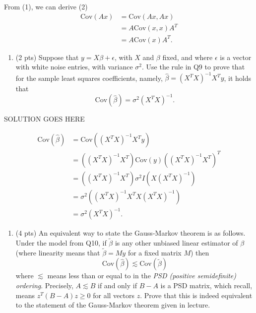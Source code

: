 \documentclass[
]{article}
\providecommand{\tightlist}{%
  \setlength{\itemsep}{0pt}\setlength{\parskip}{0pt}}
\begin{document}
From (1), we can derive (2) \begin{align*}
    \mathrm{Cov}(Ax) & = \mathrm{Cov}(Ax,Ax) \\
    & = A\mathrm{Cov}(x, x)A^T \\
    & = A\mathrm{Cov}(x)A^T.
\end{align*}

\begin{enumerate}
\def\labelenumi{\arabic{enumi}.}
\setcounter{enumi}{9}
\tightlist
\item
  (2 pts) Suppose that \(y = X \beta + \epsilon\), with \(X\) and
  \(\beta\) fixed, and where \(\epsilon\) is a vector with white noise
  entries, with variance \(\sigma^2\). Use the rule in Q9 to prove that
  for the sample least squares coefficients, namely,
  \(\hat\beta = (X^T X)^{-1} X^T y\), it holds that \[
  \mathrm{Cov}(\hat\beta) = \sigma^2 (X^T X)^{-1}.
  \]
\end{enumerate}

SOLUTION GOES HERE

\begin{align*}
    \mathrm{Cov}(\hat{\beta}) & = \mathrm{Cov}\left(\left(X^TX\right)^{-1}X^Ty\right) \\
    & = \left(\left(X^TX\right)^{-1}X^T\right)\mathrm{Cov}(y)\left(\left(X^TX\right)^{-1}X^T\right)^T \\
    & = \left(\left(X^TX\right)^{-1}X^T\right)\sigma^2I\left(X\left(X^TX\right)^{-1}\right) \\
    & = \sigma^2\left(\left(X^TX\right)^{-1}X^TX\left(X^TX\right)^{-1}\right) \\
    & = \sigma^2\left(X^TX\right)^{-1}.
\end{align*}

\begin{enumerate}
\def\labelenumi{\arabic{enumi}.}
\setcounter{enumi}{10}
\tightlist
\item
  (4 pts) An equivalent way to state the Gauss-Markov theorem is as
  follows. Under the model from Q10, if \(\tilde\beta\) is any other
  unbiased linear estimator of \(\beta\) (where linearity means that
  \(\tilde\beta = My\) for a fixed matrix \(M\)) then \[
  \mathrm{Cov}(\hat\beta) \lesssim \mathrm{Cov}(\tilde\beta)
  \] where \(\lesssim\) means less than or equal to in the \emph{PSD
  (positive semidefinite) ordering}. Precisely, \(A \lesssim B\) if and
  only if \(B-A\) is a PSD matrix, which recall, means
  \(z^T (B-A) z \geq 0\) for all vectors \(z\). Prove that this is
  indeed equivalent to the statement of the Gauss-Markov theorem given
  in lecture.
\end{enumerate}
\end{document}
